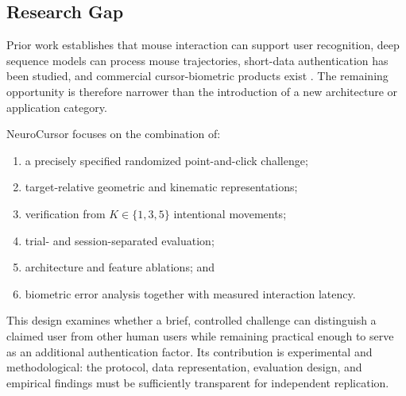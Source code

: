 \documentclass[conference]{IEEEtran}
\begin{document}
\subsection{Research Gap}

Prior work establishes that mouse interaction can support user recognition,
deep sequence models can process mouse trajectories, short-data
authentication has been studied, and commercial cursor-biometric products
exist \cite{antalMouseCNN,guptaMouseRecognition,wangLTAMouse,graboxyContinuous}.
The remaining opportunity is therefore narrower than the introduction of a
new architecture or application category.

NeuroCursor focuses on the combination of:
\begin{enumerate}
    \item a precisely specified randomized point-and-click challenge;
    \item target-relative geometric and kinematic representations;
    \item verification from $K\in\{1,3,5\}$ intentional movements;
    \item trial- and session-separated evaluation;
    \item architecture and feature ablations; and
    \item biometric error analysis together with measured interaction
    latency.
\end{enumerate}

This design examines whether a brief, controlled challenge can distinguish a
claimed user from other human users while remaining practical enough to serve
as an additional authentication factor. Its contribution is experimental
and methodological: the protocol, data representation, evaluation design,
and empirical findings must be sufficiently transparent for independent
replication.

\end{document}
